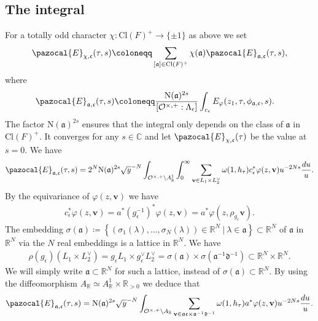 \documentclass[twoside,a4paper,10pt]{article} %
\newcommand{\8}{\infty}
\newcommand{\vbf}{\mathbf{v}}
\newcommand{\R}{\mathbb{R}}
\newcommand{\C}{\mathbb{C}}
\newcommand{\afrak}{\mathfrak{a}}
\newcommand{\dfrak}{\mathfrak{d}}
\newcommand{\cfrak}{\mathfrak{c}}
\newcommand{\N}{\mathrm{N}}
\newcommand{\Ocal}{\mathcal{O}}
\newcommand{\Cl}{\textrm{Cl}}
\newcommand{\Ecal}{\pazocal{E}}
\theoremstyle{mytheoremstyle}
\theoremstyle{remark}
\numberwithin{equation}{section}
\begin{document}
\subsection{The integral} 
For a totally odd character $\chi \colon \Cl(F)^+ \longrightarrow \{ \pm 1\}$ as above we set
\begin{align}
\Ecal_{\chi,\cfrak}(\tau,s) \coloneqq \sum_{[\afrak] \in \Cl(F)^+} \chi(\afrak) \Ecal_{\afrak,\cfrak}(\tau,s),
\end{align}
where
\begin{align}\label{intermediate label}
\Ecal_{\afrak,\cfrak}(\tau,s) & \coloneqq   \frac{\N(\afrak)^{2s}}{[\Ocal^{\times,+}:\Lambda_\epsilon]}\int_{c_\epsilon} E_{\varphi}(z_1,\tau,\phi_{\afrak,\cfrak},s).
\end{align}
The factor $\N(\afrak)^{2s}$ ensures that the integral only depends on the class of $\afrak$ in $\Cl(F)^+$. It converges for any $s \in \C$ and let $\Ecal_{\chi,\cfrak}(\tau)$ be the value at $s=0$. We have
\begin{align} \Ecal_{\afrak,\cfrak}(\tau,s) = 2^N\N(\afrak)^{2s} \sqrt{y}^{-N} \int_{\Ocal^{\times,+} \backslash A^1_\R}\int_0^\8 \sum_{\vbf \in L_1 \times L_2^\vee } \omega(1,h_\tau)   c_\epsilon^\ast \varphi(z,\vbf) u^{-2Ns}\frac{du}{u}.
\end{align}
By the equivariance of $\varphi(z,\vbf)$ we have
\begin{align}
c_\epsilon^\ast \varphi(z,\vbf)=a^\ast (g^{-1}_{\epsilon})^\ast \varphi(z,\vbf) =a^\ast \varphi(z,\rho_{g_{\epsilon}} \vbf).
\end{align}
The embedding $\sigma(\afrak) \coloneqq \left \{ (\sigma_1(\lambda),\dots,\sigma_N(\lambda)) \in \R^N \ \vert \ \lambda \in \afrak \right \} \subset \R^N$ of $\afrak$ in $\R^N$ via the $N$ real embeddings is a lattice in $\R^N$. We have
 \begin{align} \label{translatelattice}
\rho(g_{\epsilon})(L_1 \times L_2^\vee)=g_{\epsilon} L_1 \times g_{\epsilon}^\vee L_2^\vee= \sigma(\afrak) \times \sigma(\afrak^{-1} \dfrak^{-1}) \subset \R^N \times \R^N.
\end{align}
We will simply write $\afrak \subset \R^N$ for such a lattice, instead of $\sigma(\afrak)\subset \R^N$. By using the diffeomorphism $A_\R \simeq A^1_\R \times \R_{>0}$ we deduce that
\begin{align}
\Ecal_{\afrak,\cfrak}(\tau,s) = \N(\afrak)^{2s} \sqrt{y}^{-N} \int_{\Ocal^{\times,+} \backslash A_\R} \sum_{\vbf \in \afrak\cfrak \times \afrak^{-1} \dfrak^{-1}} \omega(1,h_\tau)   a^\ast \varphi(z,\vbf) u^{-2Ns}\frac{du}{u}.
\end{align}
\end{document}
